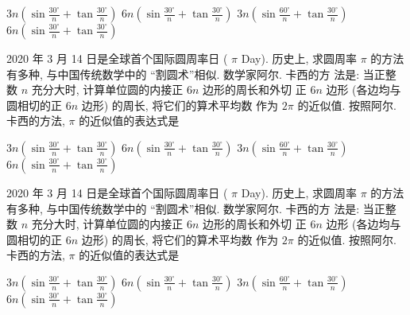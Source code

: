 \documentclass{ctexart}
\begin{document}
    \begin{xchoices}[label-hsep = 1em]
      \xitem
      $3 n(\sin \frac{30^{\circ}}{n}+\tan \frac{30^{\circ}}{n})$
      \xitem*
      $6 n(\sin \frac{30^{\circ}}{n}+\tan \frac{30^{\circ}}{n})$
      \xitem
      $3 n(\sin \frac{60^{\circ}}{n}+\tan \frac{30^{\circ}}{n})$
      \xitem
      $6 n(\sin \frac{30^{\circ}}{n}+\tan \frac{30^{\circ}}{n})$ 
    \end{xchoices}
  2020 年 3 月 14 日是全球首个国际圆周率日 ( $\pi$ Day). 历史上, 求圆周率 $\pi$ 的方法有多种, 与中国传统数学中的 “割圆术”相似. 数学家阿尔. 卡西的方 法是: 当正整数 $n$ 充分大时, 计算单位圆的内接正 $6 n$ 边形的周长和外切 正 $6 n$ 边形 (各边均与圆相切的正 $6 n$ 边形) 的周长, 将它们的算术平均数 作为 $2 \pi$ 的近似值. 按照阿尔. 卡西的方法, $\pi$ 的近似值的表达式是 \paren
    \begin{xchoices*}[
      label-pos = top, items = 2, v-sep = 0em,
      h-offset = 6em, v-offset = 0em, showanswer
    ]
      \xitem*
      $3 n(\sin \frac{30^{\circ}}{n}+\tan \frac{30^{\circ}}{n})$
      \xitem
      $6 n(\sin \frac{30^{\circ}}{n}+\tan \frac{30^{\circ}}{n})$
      \xitem*
      $3 n(\sin \frac{60^{\circ}}{n}+\tan \frac{30^{\circ}}{n})$
      \xitem
      $6 n(\sin \frac{30^{\circ}}{n}+\tan \frac{30^{\circ}}{n})$ 
    \end{xchoices*}
    2020 年 3 月 14 日是全球首个国际圆周率日 ( $\pi$ Day). 历史上, 求圆周率 $\pi$ 的方法有多种, 与中国传统数学中的 “割圆术”相似. 数学家阿尔. 卡西的方 法是: 当正整数 $n$ 充分大时, 计算单位圆的内接正 $6 n$ 边形的周长和外切 正 $6 n$ 边形 (各边均与圆相切的正 $6 n$ 边形) 的周长, 将它们的算术平均数 作为 $2 \pi$ 的近似值. 按照阿尔. 卡西的方法, $\pi$ 的近似值的表达式是 \paren
    \begin{xchoices*}[
      label-pos = top, items = 2, v-sep = 0em,
      h-offset = 6em, v-offset = 0em, showanswer
    ]
      \xitem
      $3 n(\sin \frac{30^{\circ}}{n}+\tan \frac{30^{\circ}}{n})$
      \xitem*
      $6 n(\sin \frac{30^{\circ}}{n}+\tan \frac{30^{\circ}}{n})$
      \xitem*
      $3 n(\sin \frac{60^{\circ}}{n}+\tan \frac{30^{\circ}}{n})$
      \xitem
      $6 n(\sin \frac{30^{\circ}}{n}+\tan \frac{30^{\circ}}{n})$ 
    \end{xchoices*}
\end{document}
